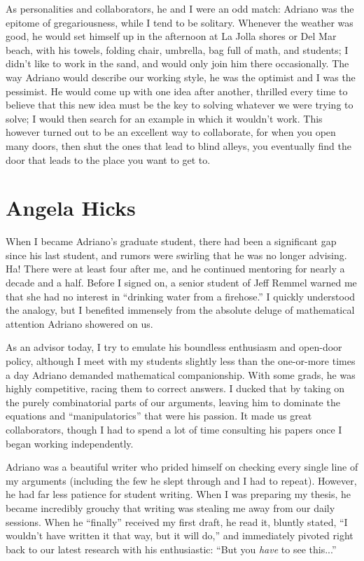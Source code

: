 \documentclass{amsart}
\begin{document}
As personalities and collaborators, he and I were an odd match: Adriano was the epitome of gregariousness, while I tend to be solitary.  Whenever the weather was good, he would set himself up in the afternoon at La Jolla shores or Del Mar beach, with his towels, folding chair, umbrella, bag full of math, and students; I didn't like to work in the sand, and would only join him there occasionally.  The way Adriano would describe our working style, he was the optimist and I was the pessimist.  He would come up with one idea after another, thrilled every time to believe that this new idea must be the key to solving whatever we were trying to solve; I would then search for an example in which it wouldn't work.  This however turned out to be an excellent way to collaborate, for when you open many doors, then shut the ones that lead to blind alleys, you eventually find the door that leads to the place you want to get to.

\section*{Angela Hicks}

When I became Adriano's graduate student, there had been a significant gap since his last student, and rumors were swirling that he was no longer advising. Ha! There were at least four after me, and he continued mentoring for nearly a decade and a half. Before I signed on, a senior student of Jeff Remmel warned me that she had no interest in ``drinking water from a firehose.'' I quickly understood the analogy, but I benefited immensely from the absolute deluge of mathematical attention Adriano showered on us.

As an advisor today, I try to emulate his boundless enthusiasm and open-door policy, although I meet with my students slightly less than the one-or-more times a day Adriano demanded mathematical companionship. With some grads, he was highly competitive, racing them to correct answers. I ducked that by taking on the purely combinatorial parts of our arguments, leaving him to dominate the equations and ``manipulatorics'' that were his passion. It made us great collaborators, though I had to spend a lot of time consulting his papers once I began working independently.

Adriano was a beautiful writer who prided himself on checking every single line of my arguments (including the few he slept through and I had to repeat). However, he had far less patience for student writing. When I was preparing my thesis, he became incredibly grouchy that writing was stealing me away from our daily sessions. When he ``finally'' received my first draft, he read it, bluntly stated, ``I wouldn’t have written it that way, but it will do,'' and immediately pivoted right back to our latest research with his enthusiastic: ``But you {\em have} to see this...''
\end{document}
